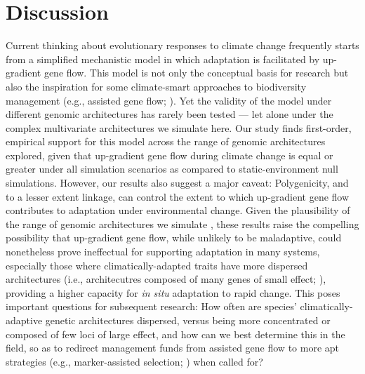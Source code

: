 \documentclass[9pt,twocolumn,twoside,lineno]{pnas-new}
\begin{document}
\section*{Discussion}

Current thinking about evolutionary responses to climate change
frequently starts from a simplified mechanistic model in which
adaptation is facilitated by up-gradient gene flow.
This model is not only the conceptual basis for research
but also the inspiration for some climate-smart
approaches to biodiversity management
(e.g., assisted gene flow; \cite{aitken_whitlock}).
Yet the validity of the model under different
genomic architectures has rarely been tested --- let
alone under the complex multivariate architectures we simulate here.
Our study finds first-order, empirical support for this
model across the range of genomic architectures explored,
given that up-gradient gene flow during climate change
is equal or greater under all simulation scenarios
as compared to static-environment null simulations.
However, our results also suggest a major caveat:
Polygenicity, and to a lesser extent linkage,
can control the extent to which up-gradient
gene flow contributes to adaptation under environmental change.
Given the plausibility of the range of genomic architectures we simulate
\cite{barghi_polygenic,boyle,rockman,savolainen,sella,bomblies},
these results raise the compelling
possibility that up-gradient gene flow, while unlikely
to be maladaptive, could nonetheless prove
ineffectual for supporting adaptation in many systems,
especially those where climatically-adapted traits
have more dispersed architectures
(i.e., architecutres composed of many genes of small effect; \cite{yeaman_review}),
providing a higher capacity for \textit{in situ} adaptation to rapid change.
This poses important questions for subsequent research:
How often are species' climatically-adaptive
genetic architectures dispersed,
versus being more concentrated or composed of
few loci of large effect,
and how can we best determine this in the field, 
so as to redirect management funds from assisted gene flow
to more apt strategies (e.g., marker-assisted selection;
\cite{muranty}) when called for?
\end{document}
